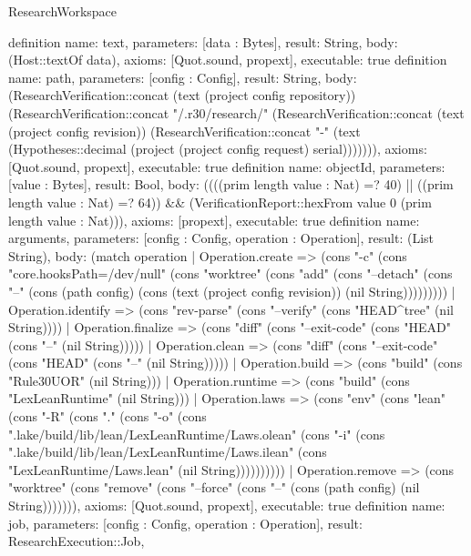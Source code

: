 \begin{lexlean}{ResearchWorkspace}
\begin{semanticmodule}
definition{
 name: text,
 parameters: [data : Bytes],
 result: String,
 body: (Host::textOf data),
 axioms: [Quot.sound, propext],
 executable: true
}
definition{
 name: path,
 parameters: [config : Config],
 result: String,
 body: (ResearchVerification::concat (text (project config repository)) (ResearchVerification::concat "/.r30/research/" (ResearchVerification::concat (text (project config revision)) (ResearchVerification::concat "-" (text (Hypotheses::decimal (project (project config request) serial))))))),
 axioms: [Quot.sound, propext],
 executable: true
}
definition{
 name: objectId,
 parameters: [value : Bytes],
 result: Bool,
 body: ((((prim length value : Nat) =? 40) || ((prim length value : Nat) =? 64)) && (VerificationReport::hexFrom value 0 (prim length value : Nat))),
 axioms: [propext],
 executable: true
}
definition{
 name: arguments,
 parameters: [config : Config, operation : Operation],
 result: (List String),
 body: (match operation
 | Operation.create => (cons "-c" (cons "core.hooksPath=/dev/null" (cons "worktree" (cons "add" (cons "--detach" (cons "--" (cons (path config) (cons (text (project config revision)) (nil String)))))))))
 | Operation.identify => (cons "rev-parse" (cons "--verify" (cons "HEAD^{tree}" (nil String))))
 | Operation.finalize => (cons "diff" (cons "--exit-code" (cons "HEAD" (cons "--" (nil String)))))
 | Operation.clean => (cons "diff" (cons "--exit-code" (cons "HEAD" (cons "--" (nil String)))))
 | Operation.build => (cons "build" (cons "Rule30UOR" (nil String)))
 | Operation.runtime => (cons "build" (cons "LexLeanRuntime" (nil String)))
 | Operation.laws => (cons "env" (cons "lean" (cons "-R" (cons "." (cons "-o" (cons ".lake/build/lib/lean/LexLeanRuntime/Laws.olean" (cons "-i" (cons ".lake/build/lib/lean/LexLeanRuntime/Laws.ilean" (cons "LexLeanRuntime/Laws.lean" (nil String))))))))))
 | Operation.remove => (cons "worktree" (cons "remove" (cons "--force" (cons "--" (cons (path config) (nil String))))))),
 axioms: [Quot.sound, propext],
 executable: true
}
definition{
 name: job,
 parameters: [config : Config, operation : Operation],
 result: ResearchExecution::Job,
}
\end{semanticmodule}
\end{lexlean}
